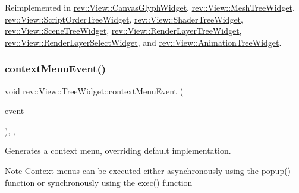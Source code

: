 Reimplemented in \mbox{\hyperlink{classrev_1_1_view_1_1_canvas_glyph_widget_a2c05ba4850db7c75a954a4dcda3f980f}{rev\+::\+View\+::\+Canvas\+Glyph\+Widget}}, \mbox{\hyperlink{classrev_1_1_view_1_1_mesh_tree_widget_a1fe0980bbddcafe4801991a0a70a8a3d}{rev\+::\+View\+::\+Mesh\+Tree\+Widget}}, \mbox{\hyperlink{classrev_1_1_view_1_1_script_order_tree_widget_ac1972eb933746c0f38059c8a78f4a36d}{rev\+::\+View\+::\+Script\+Order\+Tree\+Widget}}, \mbox{\hyperlink{classrev_1_1_view_1_1_shader_tree_widget_aac6c4858df27dfdf09a0694eeb5bccd4}{rev\+::\+View\+::\+Shader\+Tree\+Widget}}, \mbox{\hyperlink{classrev_1_1_view_1_1_scene_tree_widget_af0acbcb9d6cb9b0b209d0a9e11f563f3}{rev\+::\+View\+::\+Scene\+Tree\+Widget}}, \mbox{\hyperlink{classrev_1_1_view_1_1_render_layer_tree_widget_afa490edab7f0472cae72674be7b1462f}{rev\+::\+View\+::\+Render\+Layer\+Tree\+Widget}}, \mbox{\hyperlink{classrev_1_1_view_1_1_render_layer_select_widget_af00c2a10bb0fafd2814b11a7abed74fc}{rev\+::\+View\+::\+Render\+Layer\+Select\+Widget}}, and \mbox{\hyperlink{classrev_1_1_view_1_1_animation_tree_widget_aa2b7b831a03e3954d9e37ac361ee7385}{rev\+::\+View\+::\+Animation\+Tree\+Widget}}.

\mbox{\label{classrev_1_1_view_1_1_tree_widget_a47fe709b7b08a5d327a66d091e64820b}} 
\subsubsection{\texorpdfstring{contextMenuEvent()}{contextMenuEvent()}}
{\footnotesize\ttfamily void rev\+::\+View\+::\+Tree\+Widget\+::context\+Menu\+Event (\begin{DoxyParamCaption}\item[{Q\+Context\+Menu\+Event $\ast$}]{event }\end{DoxyParamCaption})\hspace{0.3cm}{\ttfamily [override]}, {\ttfamily [protected]}, {\ttfamily [virtual]}}



Generates a context menu, overriding default implementation. 

\begin{DoxyNote}{Note}
Context menus can be executed either asynchronously using the popup() function or synchronously using the exec() function 
\end{DoxyNote}


